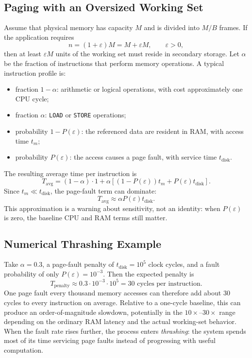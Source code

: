 \subsection{Paging with an Oversized Working Set}
\label{subsec:paging-model}

Assume that physical memory has capacity $M$ and is divided into $M/B$ frames.
If the application requires
\[
  n=(1+\varepsilon)M=M+\varepsilon M,
  \qquad \varepsilon>0,
\]
then at least $\varepsilon M$ units of the working set must reside in
secondary storage. Let $\alpha$ be the fraction of instructions that perform
memory operations. A typical instruction profile is:

\begin{itemize}
  \item fraction $1-\alpha$: arithmetic or logical operations, with cost
    approximately one CPU cycle;
  \item fraction $\alpha$: \texttt{LOAD} or \texttt{STORE} operations;
  \item probability $1-P(\varepsilon)$: the referenced data are resident in
    RAM, with access time $t_m$;
  \item probability $P(\varepsilon)$: the access causes a page fault, with
    service time $t_{\mathrm{disk}}$.
\end{itemize}

The resulting average time per instruction is
\[
  T_{\mathrm{avg}}=(1-\alpha)\cdot1
  +\alpha\left[(1-P(\varepsilon))t_m
  +P(\varepsilon)t_{\mathrm{disk}}\right].
\]
Since $t_m\ll t_{\mathrm{disk}}$, the page-fault term can dominate:
\[
  T_{\mathrm{avg}}\approx
  \alpha P(\varepsilon)t_{\mathrm{disk}}.
\]
This approximation is a warning about sensitivity, not an identity: when
$P(\varepsilon)$ is zero, the baseline CPU and RAM terms still matter.

\subsection{Numerical Thrashing Example}
\label{subsec:thrashing}

Take $\alpha=0.3$, a page-fault penalty of
$t_{\mathrm{disk}}=10^5$ clock cycles, and a fault probability of only
$P(\varepsilon)=10^{-3}$. Then the expected penalty is
\[
  T_{\mathrm{penalty}}
  \approx 0.3\cdot10^{-3}\cdot10^5
  =30\text{ cycles per instruction}.
\]
One page fault every thousand memory accesses can therefore add about $30$
cycles to every instruction on average. Relative to a one-cycle baseline,
this can produce an order-of-magnitude slowdown, potentially in the
$10\times$--$30\times$ range depending on the ordinary RAM latency and the
actual working-set behavior. When the fault rate rises further, the process
enters \emph{thrashing}: the system spends most of its time servicing page
faults instead of progressing with useful computation.

